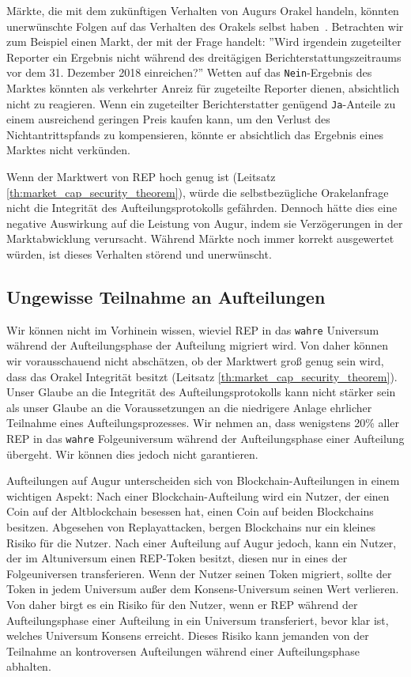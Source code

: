\documentclass[floatfix,reprint,nofootinbib,amsmath,amssymb,epsfig,pre,floats,letterpaper,groupedaffiliation]{revtex4-1}
\theoremstyle{definition}
\theoremstyle{definition}
\theoremstyle{definition}
\begin{document}
Märkte, die mit dem zukünftigen Verhalten von Augurs Orakel handeln, könnten unerwünschte Folgen auf das Verhalten des Orakels selbst haben~\cite{Othman_2010}. Betrachten wir zum Beispiel einen Markt, der mit der Frage handelt: ''Wird irgendein zugeteilter Reporter ein Ergebnis nicht während des dreitägigen Berichterstattungszeitraums vor dem 31. Dezember 2018 einreichen?'' Wetten auf das \texttt{Nein}-Ergebnis des Marktes könnten als verkehrter Anreiz für zugeteilte Reporter dienen, absichtlich nicht zu reagieren. Wenn ein zugeteilter Berichterstatter genügend \texttt{Ja}-Anteile zu einem ausreichend geringen Preis kaufen kann, um den Verlust des Nichtantrittspfands zu kompensieren, könnte er absichtlich das Ergebnis eines Marktes nicht verkünden.

Wenn der Marktwert von REP hoch genug ist (Leitsatz \ref{th:market_cap_security_theorem}), würde die selbstbezügliche Orakelanfrage nicht die Integrität des Aufteilungsprotokolls gefährden. Dennoch hätte dies eine negative Auswirkung auf die Leistung von Augur, indem sie Verzögerungen in der Marktabwicklung verursacht. Während Märkte noch immer korrekt ausgewertet würden, ist dieses Verhalten störend und unerwünscht.

\subsection{Ungewisse Teilnahme an Aufteilungen}\label{subsection:uncertain_fork_participation}

Wir können nicht im Vorhinein wissen, wieviel REP in das \texttt{wahre} Universum während der Aufteilungsphase der Aufteilung migriert wird. Von daher können wir vorausschauend nicht abschätzen, ob der Marktwert groß genug sein wird, dass das Orakel Integrität besitzt (Leitsatz \ref{th:market_cap_security_theorem}). Unser Glaube an die Integrität des Aufteilungsprotokolls kann nicht stärker sein als unser Glaube an die Voraussetzungen an die niedrigere Anlage ehrlicher Teilnahme eines Aufteilungsprozesses. Wir nehmen an, dass wenigstens 20\% aller REP in das \texttt{wahre} Folgeuniversum während der Aufteilungsphase einer Aufteilung übergeht. Wir können dies jedoch nicht garantieren.

Aufteilungen auf Augur unterscheiden sich von Blockchain-Aufteilungen in einem wichtigen Aspekt: Nach einer Blockchain-Aufteilung wird ein Nutzer, der einen Coin auf der Altblockchain besessen hat, einen Coin auf beiden Blockchains besitzen. Abgesehen von Replayattacken, bergen Blockchains nur ein kleines Risiko für die Nutzer. Nach einer Aufteilung auf Augur jedoch, kann ein Nutzer, der im Altuniversum einen REP-Token besitzt, diesen nur in eines der Folgeuniversen transferieren. Wenn der Nutzer seinen Token migriert, sollte der Token in jedem Universum außer dem Konsens-Universum seinen Wert verlieren. Von daher birgt es ein Risiko für den Nutzer, wenn er REP während der Aufteilungsphase einer Aufteilung in ein Universum transferiert, bevor klar ist, welches Universum Konsens erreicht. Dieses Risiko kann jemanden von der Teilnahme an kontroversen Aufteilungen während einer Aufteilungsphase abhalten.
\end{document}
